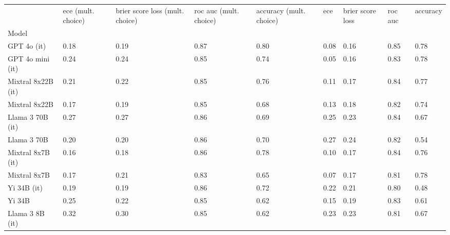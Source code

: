 \begin{tabular}{lllllllll}
\toprule
 & ece (mult. choice) & brier score loss (mult. choice) & roc auc (mult. choice) & accuracy (mult. choice) & ece & brier score loss & roc auc & accuracy \\
Model &  &  &  &  &  &  &  &  \\
\midrule
GPT 4o (it) & \cellcolor{cyan!3.9} 0.18 & \cellcolor{cyan!20.5} 0.19 & \cellcolor{cyan!25.0} 0.87 & \cellcolor{cyan!25.0} 0.80 & 0.08 & \cellcolor{cyan!25.0} 0.16 & \cellcolor{cyan!25.0} 0.85 & \cellcolor{cyan!25.0} 0.78 \\
GPT 4o mini (it) & 0.24 & 0.24 & \cellcolor{cyan!7.7} 0.85 & 0.74 & \cellcolor{cyan!25.0} 0.05 & \cellcolor{cyan!22.6} 0.16 & \cellcolor{cyan!10.9} 0.83 & \cellcolor{cyan!22.6} 0.78 \\
Mixtral 8x22B (it) & 0.21 & \cellcolor{cyan!3.6} 0.22 & \cellcolor{cyan!1.6} 0.85 & \cellcolor{cyan!3.9} 0.76 & 0.11 & \cellcolor{cyan!13.2} 0.17 & \cellcolor{cyan!15.1} 0.84 & \cellcolor{cyan!17.1} 0.77 \\
Mixtral 8x22B & \cellcolor{cyan!13.2} 0.17 & \cellcolor{cyan!21.6} 0.19 & \cellcolor{cyan!6.7} 0.85 & 0.68 & 0.13 & \cellcolor{cyan!1.4} 0.18 & \cellcolor{cyan!0.4} 0.82 & \cellcolor{cyan!0.8} 0.74 \\
Llama 3 70B (it) & 0.27 & 0.27 & \cellcolor{cyan!14.8} 0.86 & 0.69 & 0.25 & 0.23 & \cellcolor{cyan!12.3} 0.84 & 0.67 \\
Llama 3 70B & 0.20 & \cellcolor{cyan!14.9} 0.20 & \cellcolor{cyan!10.8} 0.86 & 0.70 & 0.27 & 0.24 & 0.82 & 0.54 \\
Mixtral 8x7B (it) & \cellcolor{cyan!16.8} 0.16 & \cellcolor{cyan!25.0} 0.18 & \cellcolor{cyan!9.8} 0.86 & \cellcolor{cyan!17.4} 0.78 & 0.10 & \cellcolor{cyan!13.2} 0.17 & \cellcolor{cyan!13.0} 0.84 & \cellcolor{cyan!11.1} 0.76 \\
Mixtral 8x7B & \cellcolor{cyan!10.6} 0.17 & \cellcolor{cyan!11.5} 0.21 & 0.83 & 0.65 & \cellcolor{cyan!4.0} 0.07 & \cellcolor{cyan!10.8} 0.17 & 0.81 & \cellcolor{cyan!23.2} 0.78 \\
Yi 34B (it) & \cellcolor{cyan!1.3} 0.19 & \cellcolor{cyan!18.8} 0.19 & \cellcolor{cyan!9.8} 0.86 & 0.72 & 0.22 & 0.21 & 0.80 & 0.48 \\
Yi 34B & 0.25 & \cellcolor{cyan!2.5} 0.22 & \cellcolor{cyan!3.7} 0.85 & 0.62 & 0.15 & 0.19 & \cellcolor{cyan!8.1} 0.83 & 0.61 \\
Llama 3 8B (it) & 0.32 & 0.30 & \cellcolor{cyan!3.7} 0.85 & 0.62 & 0.23 & 0.23 & 0.81 & 0.67 \\

\end{tabular}
